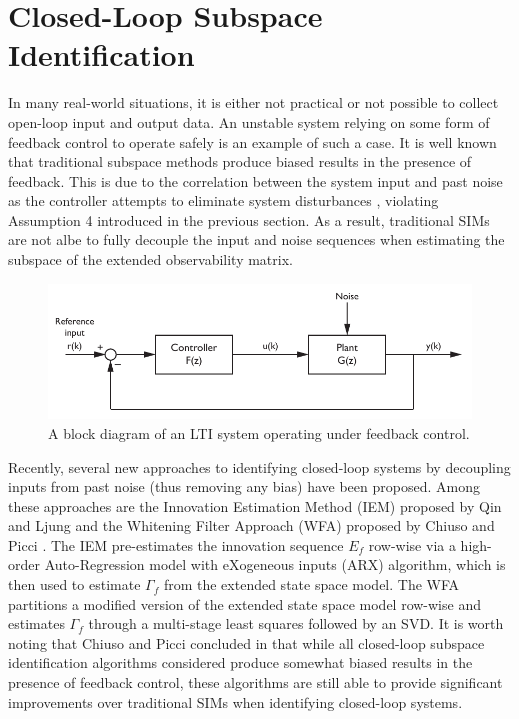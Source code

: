 \section{Closed-Loop Subspace Identification}\label{sec:closed-loop_subspace_identification}
In many real-world situations, it is either not practical or not possible to collect open-loop input and output data. An unstable system relying on some form of feedback control to operate safely is an example of such a case. It is well known that traditional subspace methods produce biased results in the presence of feedback. This is due to the correlation between the system input and past noise as the controller attempts to eliminate system disturbances \cite{qin2006overview}, violating Assumption 4 introduced in the previous section. As a result, traditional SIMs are not albe to fully decouple the input and noise sequences when estimating the subspace of the extended observability matrix.
\begin{figure}[htb!]
	\centering
	\includegraphics{../fig/closed_loop_block_diagram.pdf}
	\caption{A block diagram of an LTI system operating under feedback control.}
\end{figure}

Recently, several new approaches to identifying closed-loop systems by decoupling inputs from past noise (thus removing any bias) have been proposed. Among these approaches are the Innovation Estimation Method (IEM) proposed by Qin and Ljung \cite{qin2003closed} and the Whitening Filter Approach (WFA) proposed by Chiuso and Picci \cite{chiuso2005consistency}. The IEM pre-estimates the innovation sequence $E_f$ row-wise via a high-order Auto-Regression model with eXogeneous inputs (ARX) algorithm, which is then used to estimate $\Gamma_f$ from the extended state space model. The WFA partitions a modified version of the extended state space model row-wise and estimates $\Gamma_f$ through a multi-stage least squares followed by an SVD. It is worth noting that Chiuso and Picci concluded in \cite{chiuso2005consistency} that while all closed-loop subspace identification algorithms considered produce somewhat biased results in the presence of feedback control, these algorithms are still able to provide significant improvements over traditional SIMs when identifying closed-loop systems.

